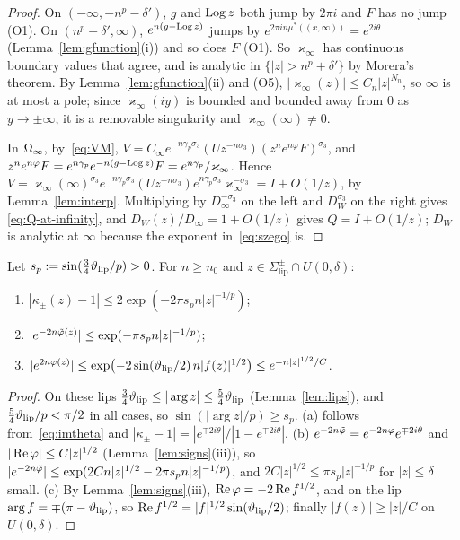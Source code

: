 \begin{proof}
On $(-\infty,-n^p-\delta')$, $g$ and $\operatorname{Log} z$ both jump by $2\pi i$ and $F$ has no jump (O1). On $(n^p+\delta',\infty)$,
$e^{n(g-\operatorname{Log} z)}$ jumps by $e^{2\pi in\mu^*((x,\infty))}=e^{2i\theta}$ (Lemma~\ref{lem:gfunction}(i)) and so does $F$ (O1). So
$\varkappa_\infty$ has continuous boundary values that agree, and is analytic in $\{|z|>n^p+\delta'\}$ by Morera's theorem.
By Lemma~\ref{lem:gfunction}(ii) and (O5), $|\varkappa_\infty(z)|\le C_n|z|^{N_n}$, so $\infty$ is at most a pole; since
$\varkappa_\infty(iy)$ is bounded and bounded away from $0$ as $y\to\pm\infty$, it is a removable singularity and
$\varkappa_\infty(\infty)\ne0$.

In $\Omega_{\infty}$, by~\eqref{eq:VM}, $V=C_\infty e^{-n\gamma_p\sigma_3}(Uz^{-n\sigma_3})(z^ne^{n\varphi}F)^{\sigma_3}$, and
$z^ne^{n\varphi}F=e^{n\gamma_p}e^{-n(g-\operatorname{Log} z)}F=e^{n\gamma_p}/\varkappa_\infty$. Hence
$V=\varkappa_\infty(\infty)^{\sigma_3}e^{-n\gamma_p\sigma_3}(Uz^{-n\sigma_3})e^{n\gamma_p\sigma_3}\varkappa_\infty^{-\sigma_3}=I+O(1/z)$,
by Lemma~\ref{lem:interp}. Multiplying by $D_\infty^{-\sigma_3}$ on the left and $D_W^{\sigma_3}$ on the right gives
\eqref{eq:Q-at-infinity}, and $D_W(z)/D_\infty=1+O(1/z)$ gives $Q=I+O(1/z)$; $D_W$ is analytic at $\infty$ because the
exponent in~\eqref{eq:szego} is.
\end{proof}

\begin{lemma}\label{lem:supersmall}
Let $s_p:=\sin(\frac34\vartheta_{\mathrm{lip}}/p)>0$. For $n\ge n_0$ and $z\in\Sigma^\pm_{\mathrm{lip}}\cap U(0,\delta)$:
\begin{enumerate}
\item[(a)] $|\kappa_\pm(z)-1|\le2\exp(-2\pi s_pn|z|^{-1/p})$;
\item[(b)] $|e^{-2n\tilde\varphi(z)}|\le\exp(-\pi s_pn|z|^{-1/p})$;
\item[(c)] $|e^{2n\varphi(z)}|\le\exp\bigl(-2\sin(\vartheta_{\mathrm{lip}}/2)\,n|f(z)|^{1/2}\bigr)\le e^{-n|z|^{1/2}/C}$.
\end{enumerate}
\end{lemma}

\begin{proof}
On these lips $\frac34\vartheta_{\mathrm{lip}}\le|\arg z|\le\frac54\vartheta_{\mathrm{lip}}$ (Lemma~\ref{lem:lips}), and $\frac54\vartheta_{\mathrm{lip}}/p<\pi/2$ in all cases,
so $\sin(|\arg z|/p)\ge s_p$. (a) follows from~\eqref{eq:imtheta} and $|\kappa_\pm-1|=|e^{\mp2i\theta}|/|1-e^{\mp2i\theta}|$.
(b) $e^{-2n\tilde\varphi}=e^{-2n\varphi}e^{\mp2i\theta}$ and $|\operatorname{Re}\varphi|\le C|z|^{1/2}$ (Lemma~\ref{lem:signs}(iii)), so
$|e^{-2n\tilde\varphi}|\le\exp(2Cn|z|^{1/2}-2\pi s_pn|z|^{-1/p})$, and $2C|z|^{1/2}\le\pi s_p|z|^{-1/p}$ for $|z|\le\delta$ small.
(c) By Lemma~\ref{lem:signs}(iii), $\operatorname{Re}\varphi=-2\operatorname{Re} f^{1/2}$, and on the lip $\arg f=\mp(\pi-\vartheta_{\mathrm{lip}})$, so
$\operatorname{Re} f^{1/2}=|f|^{1/2}\sin(\vartheta_{\mathrm{lip}}/2)$; finally $|f(z)|\ge|z|/C$ on $U(0,\delta)$.
\end{proof}

